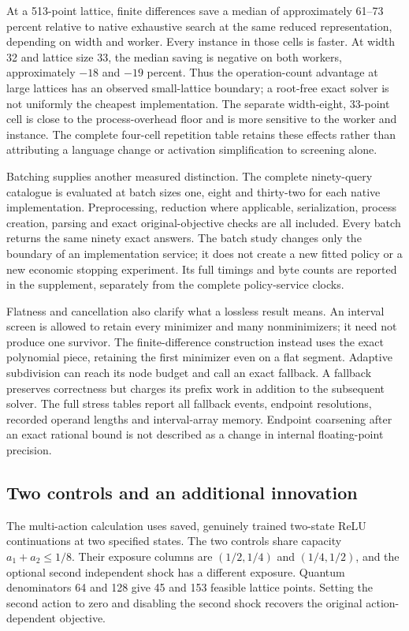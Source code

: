 

At a 513-point lattice, finite differences save a median of approximately 61--73 percent relative to native exhaustive search at the same reduced representation, depending on width and worker. Every instance in those cells is faster. At width 32 and lattice size 33, the median saving is negative on both workers, approximately $-18$ and $-19$ percent. Thus the operation-count advantage at large lattices has an observed small-lattice boundary; a root-free exact solver is not uniformly the cheapest implementation. The separate width-eight, 33-point cell is close to the process-overhead floor and is more sensitive to the worker and instance. The complete four-cell repetition table retains these effects rather than attributing a language change or activation simplification to screening alone.

Batching supplies another measured distinction. The complete ninety-query catalogue is evaluated at batch sizes one, eight and thirty-two for each native implementation. Preprocessing, reduction where applicable, serialization, process creation, parsing and exact original-objective checks are all included. Every batch returns the same ninety exact answers. The batch study changes only the boundary of an implementation service; it does not create a new fitted policy or a new economic stopping experiment. Its full timings and byte counts are reported in the supplement, separately from the complete policy-service clocks.

Flatness and cancellation also clarify what a lossless result means. An interval screen is allowed to retain every minimizer and many nonminimizers; it need not produce one survivor. The finite-difference construction instead uses the exact polynomial piece, retaining the first minimizer even on a flat segment. Adaptive subdivision can reach its node budget and call an exact fallback. A fallback preserves correctness but charges its prefix work in addition to the subsequent solver. The full stress tables report all fallback events, endpoint resolutions, recorded operand lengths and interval-array memory. Endpoint coarsening after an exact rational bound is not described as a change in internal floating-point precision.

\subsection{Two controls and an additional innovation}
The multi-action calculation uses saved, genuinely trained two-state ReLU continuations at two specified states. The two controls share capacity $a_1+a_2\le1/8$. Their exposure columns are $(1/2,1/4)$ and $(1/4,1/2)$, and the optional second independent shock has a different exposure. Quantum denominators 64 and 128 give 45 and 153 feasible lattice points. Setting the second action to zero and disabling the second shock recovers the original action-dependent objective.

